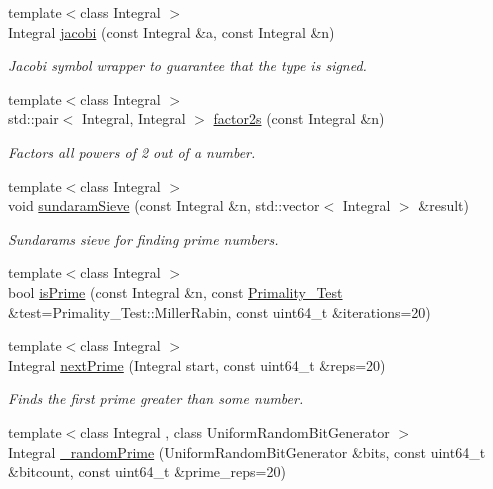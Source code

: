 \begin{DoxyCompactItemize}
{\footnotesize template$<$class Integral $>$ }\\Integral \hyperlink{namespacecryptomath_aeaf6fff4156956c6cd1c684cf2d68476}{jacobi} (const Integral \&a, const Integral \&n)
\begin{DoxyCompactList}\small\item\em Jacobi symbol wrapper to guarantee that the type is signed. \end{DoxyCompactList}\item 
{\footnotesize template$<$class Integral $>$ }\\std\+::pair$<$ Integral, Integral $>$ \hyperlink{namespacecryptomath_ad36ab56ab6b7f4626fb3ab5840fd67f1}{factor2s} (const Integral \&n)
\begin{DoxyCompactList}\small\item\em Factors all powers of 2 out of a number. \end{DoxyCompactList}\item 
{\footnotesize template$<$class Integral $>$ }\\void \hyperlink{namespacecryptomath_a6964cc63e189eadb8c74202df0fd0040}{sundaram\+Sieve} (const Integral \&n, std\+::vector$<$ Integral $>$ \&result)
\begin{DoxyCompactList}\small\item\em Sundaram\textquotesingle{}s sieve for finding prime numbers. \end{DoxyCompactList}\item 
{\footnotesize template$<$class Integral $>$ }\\bool \hyperlink{namespacecryptomath_abf75dafaf0743a34c20ca949abd858cf}{is\+Prime} (const Integral \&n, const \hyperlink{namespacecryptomath_ad814ed5cc6da07c16839c8ee79f0830d}{Primality\+\_\+\+Test} \&test=Primality\+\_\+\+Test\+::\+Miller\+Rabin, const uint64\+\_\+t \&iterations=20)
\item 
{\footnotesize template$<$class Integral $>$ }\\Integral \hyperlink{namespacecryptomath_a50fd8408608cf109b166fbc13268cbd0}{next\+Prime} (Integral start, const uint64\+\_\+t \&reps=20)
\begin{DoxyCompactList}\small\item\em Finds the first prime greater than some number. \end{DoxyCompactList}\item 
{\footnotesize template$<$class Integral , class Uniform\+Random\+Bit\+Generator $>$ }\\Integral \hyperlink{namespacecryptomath_a01547d5de9fda1bcfb783be02d512d06}{\+\_\+random\+Prime} (Uniform\+Random\+Bit\+Generator \&bits, const uint64\+\_\+t \&bitcount, const uint64\+\_\+t \&prime\+\_\+reps=20)

\end{DoxyCompactItemize}
